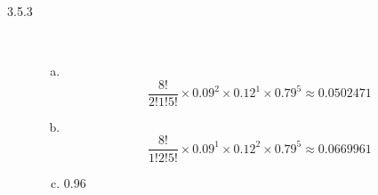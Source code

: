 \documentclass[letterpaper,10pt]{article}
\begin{document}
\begin{description}
\item[3.5.3] \ 
\begin{enumerate}[a)]
\item\ \[ \frac{8!}{2!1!5!}\times 0.09^{2}\times 0.12^{1} \times 0.79^{5} \approx 0.0502471 \]
\item\ \[ \frac{8!}{1!2!5!}\times 0.09^{1}\times 0.12^{2} \times 0.79^{5} \approx 0.0669961 \]
\item 0.96
\end{enumerate}

\end {description}
\end{document}

